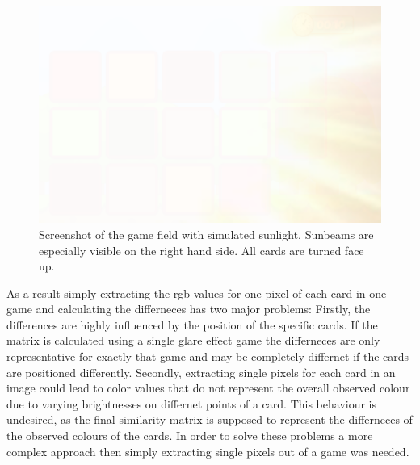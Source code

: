 \begin{figure}[H]
	\centering
	\includegraphics[width=14.5cm]{images/glareEffect.png}
	\caption[Bild kurz]{Screenshot of the game field with simulated sunlight. Sunbeams are especially visible on the right hand side. All cards are turned face up.}
	\label{fig:glareEffect}
\end{figure}

As a result simply extracting the rgb values for one pixel of each card in one game and calculating the differneces has two major problems: Firstly, the differences are highly influenced by the position of the specific cards. If the matrix is calculated using a single glare effect game the differneces are only representative for exactly that game and may be completely differnet if the cards are positioned differently. Secondly, extracting single pixels for each card in an image could lead to color values that do not represent the overall observed colour due to varying brightnesses on differnet points of a card. This behaviour is undesired, as the final similarity matrix is supposed to represent the differneces of the observed colours of the cards.  In order to solve these problems a more complex approach then simply extracting single pixels out of a game was needed. 

